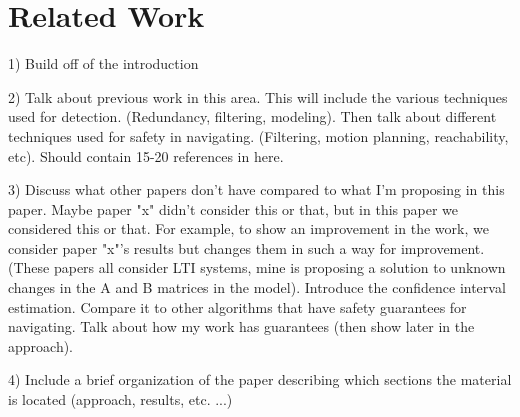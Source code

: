 
\section{Related Work} \label{sec:Related Work}

1) Build off of the introduction

2) Talk about previous work in this area. This will include the various techniques used for detection. (Redundancy, filtering, modeling). Then talk about different techniques used for safety in navigating. (Filtering, motion planning, reachability, etc). Should contain 15-20 references in here. 

3) Discuss what other papers don't have compared to what I'm proposing in this paper. Maybe paper "x" didn't consider this or that, but in this paper we considered this or that. For example, to show an improvement in the work, we consider paper "x"'s results but changes them in such a way for improvement. (These papers all consider LTI systems, mine is proposing a solution to unknown changes in the A and B matrices in the model). Introduce the confidence interval estimation. Compare it to other algorithms that have safety guarantees for navigating. Talk about how my work has guarantees (then show later in the approach).

4) Include a brief organization of the paper describing which sections the material is located (approach, results, etc. ...)